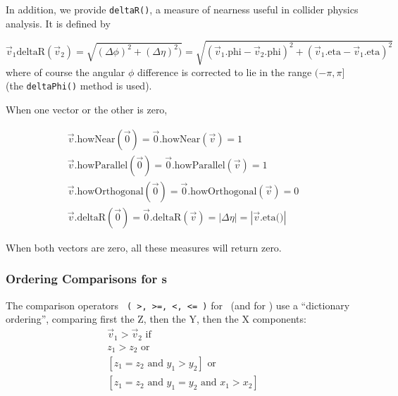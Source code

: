 In addition, we provide \verb$deltaR()$,
a measure of nearness useful in collider physics analysis.
It is defined by

\begin{equation}
\vec{v}_{1} \mbox{deltaR} (\vec{v}_{2}) =
  \sqrt{ (\Delta \phi)^2 + (\Delta \eta)^2) } =
  \sqrt{ \left( \vec{v}_{1}\mbox{.phi} - \vec{v}_{2}\mbox{.phi} \right)^2 +
  \left( \vec{v}_{1}\mbox{.eta} - \vec{v}_{1}\mbox{.eta}  \right)^2 }
  \label{eq:deltaR}
\end{equation}
\noindent
where of course the angular $\phi$ difference is corrected to lie in the range
$(-\pi, \pi]$ (the {\tt deltaPhi()} method is used).

When one vector or the other is zero,

\begin{eqnarray}
\vec{v} \mbox{.howNear} (\vec{0}) =
  \vec{0} \mbox{.howNear} (\vec{v}) = 1
  \label{eq:howNear:3}
  \\
\vec{v} \mbox{.howParallel} (\vec{0}) =
  \vec{0} \mbox{.howParallel} (\vec{v}) = 1
  \label{eq:howPar:2}
  \\
\vec{v} \mbox{.howOrthogonal} (\vec{0}) =
  \vec{0} \mbox{.howOrthogonal} (\vec{v}) = 0
  \label{eq:howOrtho:2}
  \\
\vec{v} \mbox{.deltaR} (\vec{0}) = \vec{0} \mbox{.deltaR} (\vec{v}) =
  \left| \Delta \eta \right| =
  \left| \vec{v}\mbox{.eta()} \right|
  \label{eq:deltaR:2}
\end{eqnarray}

When both vectors are zero, all these measures will return zero.

\subsubsection{Ordering Comparisons for \protect\SV s}

The comparison operators \verb$ ( >, >=, <, <= )$ for \SV\ (and for
\UV) use a ``dictionary ordering'',
comparing first the Z, then the Y, then the
X components:
\begin{eqnarray}
  \vec{v}_1 > \vec{v}_2 \mbox{ if }	\nonumber \\
	z_1 > z_2 \mbox { or } \nonumber \\
	\left[
	z_1 = z_2 \mbox { and }
	y_1 > y_2 \right] \mbox { or } \nonumber \\
	\left[
	z_1 = z_2 \mbox { and }
	y_1 = y_2 \mbox { and }
	x_1 > x_2 \right]
  \label{eq:compSV}
\end{eqnarray}


